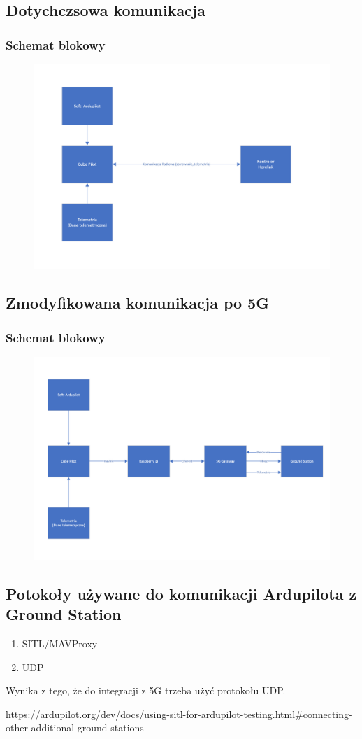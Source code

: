 \documentclass{article}
\begin{document}
\subsection{Dotychczsowa komunikacja}
\subsubsection{Schemat blokowy}
\begin{figure}[H]
    \centering
    \includegraphics[width=0.7 \textwidth]{przed.png}
    \label{fig:obraz1}
\end{figure}

\subsection{Zmodyfikowana komunikacja po 5G}
\subsubsection{Schemat blokowy}
\begin{figure}[H]
    \centering
    \includegraphics[width=0.7 \textwidth]{po.png}
    \label{fig:obraz2}
\end{figure}

\subsection{Potokoły używane do komunikacji Ardupilota z Ground Station}
\begin{enumerate}
    \item SITL/MAVProxy
    \item UDP
\end{enumerate}

\begin{center}
    Wynika z tego, że do integracji z 5G trzeba użyć protokołu UDP.
\end{center}

\begin{thebibliography}{9}
    https://ardupilot.org/dev/docs/using-sitl-for-ardupilot-testing.html#connecting-other-additional-ground-stations
\end{thebibliography}
\end{document}
